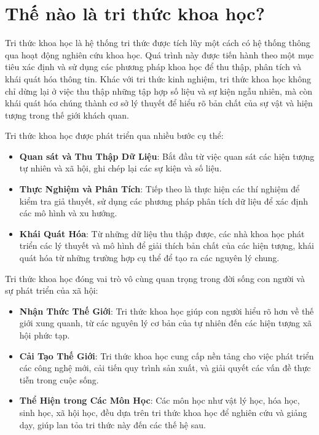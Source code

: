 \section{Thế nào là tri thức khoa học?}

Tri thức khoa học là hệ thống tri thức được tích lũy một cách có hệ thống thông qua hoạt động nghiên cứu khoa học. Quá trình này được tiến hành theo một mục tiêu xác định và sử dụng các phương pháp khoa học để thu thập, phân tích và khái quát hóa thông tin. Khác với tri thức kinh nghiệm, tri thức khoa học không chỉ dừng lại ở việc thu thập những tập hợp số liệu và sự kiện ngẫu nhiên, mà còn khái quát hóa chúng thành cơ sở lý thuyết để hiểu rõ bản chất của sự vật và hiện tượng trong thế giới khách quan.

Tri thức khoa học được phát triển qua nhiều bước cụ thể:
\begin{itemize}
    \item \textbf{Quan sát và Thu Thập Dữ Liệu}: Bắt đầu từ việc quan sát các hiện tượng tự nhiên và xã hội, ghi chép lại các sự kiện và số liệu.
    \item \textbf{Thực Nghiệm và Phân Tích}: Tiếp theo là thực hiện các thí nghiệm để kiểm tra giả thuyết, sử dụng các phương pháp phân tích dữ liệu để xác định các mô hình và xu hướng.
    \item \textbf{Khái Quát Hóa}: Từ những dữ liệu thu thập được, các nhà khoa học phát triển các lý thuyết và mô hình để giải thích bản chất của các hiện tượng, khái quát hóa từ những trường hợp cụ thể để tạo ra các nguyên lý chung.
\end{itemize}

Tri thức khoa học đóng vai trò vô cùng quan trọng trong đời sống con người và sự phát triển của xã hội:
\begin{itemize}
    \item \textbf{Nhận Thức Thế Giới}: Tri thức khoa học giúp con người hiểu rõ hơn về thế giới xung quanh, từ các nguyên lý cơ bản của tự nhiên đến các hiện tượng xã hội phức tạp.
    \item \textbf{Cải Tạo Thế Giới}: Tri thức khoa học cung cấp nền tảng cho việc phát triển các công nghệ mới, cải tiến quy trình sản xuất, và giải quyết các vấn đề thực tiễn trong cuộc sống.
    \item \textbf{Thể Hiện trong Các Môn Học}: Các môn học như vật lý học, hóa học, sinh học, xã hội học, đều dựa trên tri thức khoa học để nghiên cứu và giảng dạy, giúp lan tỏa tri thức này đến các thế hệ sau.
\end{itemize}

